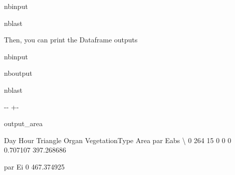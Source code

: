 \documentclass[letterpaper,10pt,english]{sphinxmanual}
\begin{document}
\begin{sphinxuseclass}{nbinput}
\begin{sphinxuseclass}{nblast}
{
\begin{sphinxVerbatim}[commandchars=\\\{\}]
\llap{\color{nbsphinxin}[6]:\,\hspace{\fboxrule}\hspace{\fboxsep}}  
  
  
  
\end{sphinxVerbatim}
}

\end{sphinxuseclass}
\end{sphinxuseclass}
\sphinxAtStartPar
Then, you can print the Dataframe outputs

\begin{sphinxuseclass}{nbinput}
{
\begin{sphinxVerbatim}[commandchars=\\\{\}]
\llap{\color{nbsphinxin}[7]:\,\hspace{\fboxrule}\hspace{\fboxsep}}
\end{sphinxVerbatim}
}

\end{sphinxuseclass}
\begin{sphinxuseclass}{nboutput}
\begin{sphinxuseclass}{nblast}
{

\kern-\sphinxverbatimsmallskipamount\kern-\baselineskip
\kern+\FrameHeightAdjust\kern-\fboxrule
\vspace{\nbsphinxcodecellspacing}

\begin{sphinxuseclass}{output_area}
\begin{sphinxuseclass}{}


\begin{sphinxVerbatim}[commandchars=\\\{\}]
   Day  Hour  Triangle  Organ  VegetationType      Area    par Eabs  \textbackslash{}
0  264    15         0      0               0  0.707107  397.268686

       par Ei
0  467.374925
\end{sphinxVerbatim}



\end{sphinxuseclass}
\end{sphinxuseclass}
}

\end{sphinxuseclass}
\end{sphinxuseclass}
\end{document}
